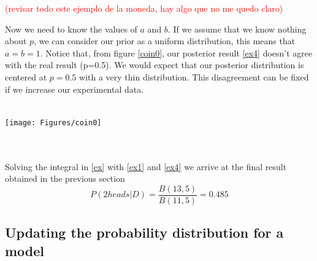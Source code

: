 \documentclass[onecolumn,           %
               showpacs,            %
               preprintnumbers,     %
               aps,                 %
               prl,          	    %
               letterpaper,             %
               superscriptaddress,      %
               nofootinbib,         %
               tightenlines,        %
               floats,floatfix      %
               ,usenatbib,
               ]{revtex4-1}
\begin{document}
\textcolor{red}{(revisar todo este ejemplo de la moneda, hay algo que no me quedo claro)}

Now we need to know the values of $a$ and $b$. If we assume that we know nothing about $p$, we can consider our prior as a uniform distribution, this means that $a=b=1$. 
Notice that, from figure \ref{coin0}, our posterior result \eqref{ex4} doesn't agree with the real result (p=0.5). We would expect that our posterior distribution is centered at $p=0.5$ with a very thin distribution. This disagreement can be fixed if we increase our experimental data.\\ $ $\\
\begin{minipage}{\textwidth}
\centering
\texttt{[image: Figures/coin0]}
\label{coin0}
\end{minipage}
\\$ $ \\
Solving the integral in \eqref{ex} with \eqref{ex1} and \eqref{ex4} we arrive at the final result obtained in the previous section
\begin{equation}
P(2heads|D)=\frac{B(13,5)}{B(11,5)}=0.485
\end{equation}
%
%
%
\subsection{Updating the probability distribution for a model} 
\end{document}
